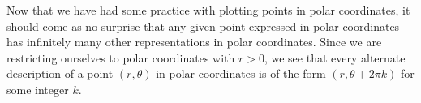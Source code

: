 Now that we have had some practice with plotting points in polar coordinates, it should come as no surprise that any given point expressed in polar coordinates has infinitely many other representations in polar coordinates.  Since we are restricting ourselves to polar coordinates with $r>0$, we see that every alternate description of a point $(r,\theta)$ in polar coordinates is of the form $(r,\theta+2\pi k)$ for some integer $k$.

\smallskip


